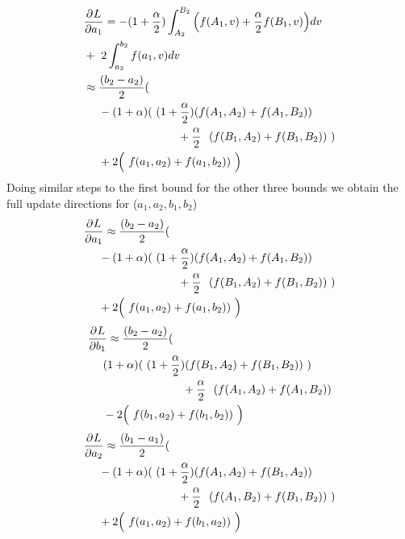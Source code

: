 \begin{equation}
\begin{aligned} 
&\frac{\partial^{} L}{\partial a_{1}} = -(1+\frac \alpha2)\int_{A_2}^{B_2}\Big(f(A_1,v) + \frac \alpha2 f(B_1,v) \Big)dv  \\ & +~2  \int_{a_{2}}^{b_{2}}f(a_1,v)dv  \\  
&\approx \frac{(b_{2}-a_{2})}{2}( \\
&~~~~-(1+ \alpha )(~(1+ \frac \alpha2 )(f(A_{1},A_{2}) + f(A_{1},B_{2}))\\ &~~~~~~~~~~~~~~~~~~~~~~~~~ +\frac \alpha2 ~~(f(B_{1},A_{2}) + f(B_{1},B_{2}))~)\\
&~~~~+ 2\Big(~f(a_{1},a_{2}) + f(a_{1},b_{2}))~\Big)
\label{eq:update-outer-2}
\end{aligned}
\end{equation}
Doing similar steps to the first bound for the other three bounds we obtain the full update directions for ($a_1 ,a_2 ,b_1 ,b_2$)
\begin{equation}
\begin{aligned} 
&\frac{\partial^{} L}{\partial a_{1}} \approx \frac{(b_{2}-a_{2})}{2}( \\
&~~~~-(1+ \alpha )(~(1+ \frac \alpha2 )(f(A_{1},A_{2}) + f(A_{1},B_{2}))\\ &~~~~~~~~~~~~~~~~~~~~~~~~~ +\frac \alpha2 ~~(f(B_{1},A_{2}) + f(B_{1},B_{2}))~)\\
&~~~~+ 2\Big(~f(a_{1},a_{2}) + f(a_{1},b_{2}))~\Big)
\label{eq:update-outer-2-1}
\end{aligned}
\end{equation}
\begin{equation}
\begin{aligned} 
&\frac{\partial^{} L}{\partial b_{1}} \approx \frac{(b_{2}-a_{2})}{2}( \\
&~~~~(1+ \alpha )(~(1+ \frac \alpha2 )(f(B_{1},A_{2}) + f(B_{1},B_{2}))~)\\ &~~~~~~~~~~~~~~~~~~~~~~~~~ +\frac \alpha2 ~~(f(A_{1},A_{2}) + f(A_{1},B_{2}))\\
&~~~~- 2\Big(~f(b_{1},a_{2}) + f(b_{1},b_{2}))~\Big)
\label{eq:update-outer-2-2}
\end{aligned}
\end{equation}
\begin{equation}
\begin{aligned} 
&\frac{\partial^{} L}{\partial a_{2}} \approx \frac{(b_{1}-a_{1})}{2}( \\
&~~~~-(1+ \alpha )(~(1+ \frac \alpha2 )(f(A_{1},A_{2}) + f(B_{1},A_{2}))\\ &~~~~~~~~~~~~~~~~~~~~~~~~~ +\frac \alpha2 ~~(f(A_{1},B_{2}) + f(B_{1},B_{2}))~)\\
&~~~~+ 2\Big(~f(a_{1},a_{2}) + f(b_{1},a_{2}))~\Big)
\label{eq:update-outer-2-3}
\end{aligned}
\end{equation}
